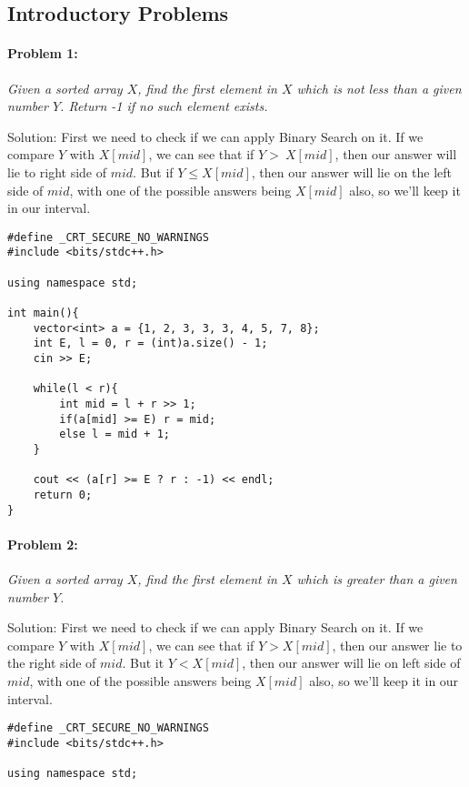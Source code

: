 \documentclass[12pt]{article}
\begin{document}
\begin{large}
\section{Introductory Problems}
\paragraph{\large Problem 1:}\textit{Given a sorted array $X$, find the first element in $X$ which is not less than a given number $Y$. Return -1 if no such element exists.}

Solution: First we need to check if we can apply Binary Search on it. If we compare $Y$ with $X[mid]$, we can see that if $Y >\ X[mid]$, then our answer will lie to right side of $mid$. But if $Y\leq X[mid]$, then our answer will lie on the left side of $mid$, with one of the possible answers being $X[mid]$ also, so we'll keep it in our interval.

\begin{verbatim}
#define _CRT_SECURE_NO_WARNINGS
#include <bits/stdc++.h>

using namespace std;

int main(){
	vector<int> a = {1, 2, 3, 3, 3, 4, 5, 7, 8}; 
	int E, l = 0, r = (int)a.size() - 1;
	cin >> E; 

	while(l < r){
		int mid = l + r >> 1; 
		if(a[mid] >= E) r = mid; 
		else l = mid + 1;
	}
	
	cout << (a[r] >= E ? r : -1) << endl; 
	return 0;  
}
\end{verbatim}

\paragraph{\large Problem 2:}\textit{Given a sorted array $X$, find the first element in $X$ which is greater than a given number $Y$.}

Solution: First we need to check if we can apply Binary Search on it. If we compare $Y$ with $X[mid]$, we can see that if $Y > X[mid]$, then our answer lie to the right side of $mid$. But it $Y < X[mid]$, then our answer will lie on left side of $mid$, with one of the possible answers being $X[mid]$ also, so we'll keep it in our interval.

\begin{verbatim}
#define _CRT_SECURE_NO_WARNINGS
#include <bits/stdc++.h>

using namespace std;


\end{verbatim}
\end{large}
\end{document}
